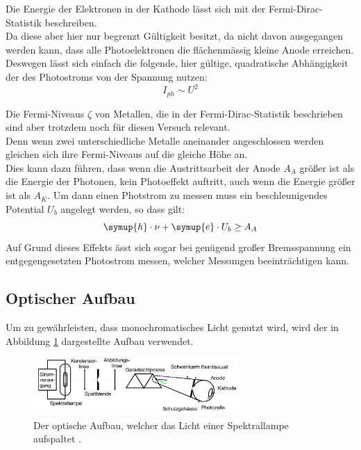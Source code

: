     \noindent Die Energie der Elektronen in der Kathode lässt sich mit der Fermi-Dirac-Statistik beschreiben.\\
    Da diese aber hier nur begrenzt Gültigkeit besitzt, da nicht davon ausgegangen werden kann, dass alle Photoelektronen die flächenmässig kleine Anode erreichen.
    Deswegen lässt sich einfach die folgende, hier gültige, quadratische Abhängigkeit der des Photostroms von der Spannung nutzen:
    \begin{equation}
        I_{ph} \sim U^2
        \label{eqn:quad}
    \end{equation}

    Die Fermi-Niveaus $\zeta$ von Metallen, die in der Fermi-Dirac-Statistik beschrieben sind aber trotzdem noch für diesen Versuch relevant.\\
    Denn wenn zwei unterschiedliche Metalle aneinander angeschlossen werden gleichen sich ihre Fermi-Niveaus auf die gleiche Höhe an.\\
    Dies kann dazu führen, dass wenn die Austrittsarbeit der Anode $A_A$ größer ist als die Energie der Photonen, kein Photoeffekt auftritt, auch wenn die Energie größer ist als $A_K$.
    Um dann einen Photstrom zu messen muss ein beschleunigendes Potential $U_b$ angelegt werden, so dass gilt:
    \begin{equation*}
        \symup{h} \cdot \nu + \symup{e} \cdot U_b \geq A_A
    \end{equation*}
    Auf Grund dieses Effekts ässt sich sogar bei genügend großer Bremsspannung ein entgegengesetzten Photostrom messen, welcher Messungen beeinträchtigen kann.




    \subsection{Optischer Aufbau}

    Um zu gewährleisten, dass monochromatisches Licht genutzt wird, wird der in Abbildung \ref{img:linse} dargestellte Aufbau verwendet.


    \begin{figure}[H]
        \centering
        \includegraphics[width=0.7\textwidth]{latex/images/Optiken.PNG}
        \caption{Der optische Aufbau, welcher das Licht einer Spektrallampe aufspaltet  \protect \cite{500}.}
        \label{img:linse}
    \end{figure}

